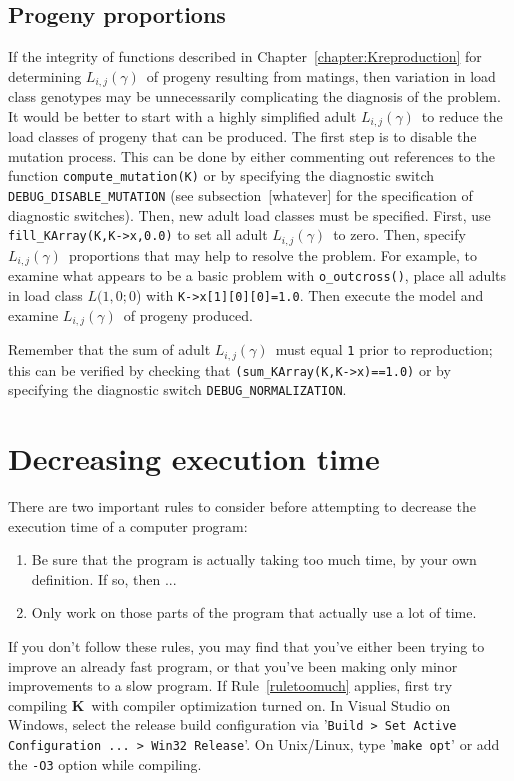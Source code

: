 \documentclass[12pt,twoside,letterpaper,fleqn]{report}
\numberwithin{equation}{section}  %
\newcommand{\K}{{\bf K}}
\newcommand{\Cmdline}[1]{{\tt #1}}
\newcommand{\LCG}[3]{\mbox{$L(#1,#2;#3$)}}
\newcommand{\Lijg}{\mbox{$L_{i,j}(\gamma)$}}     %
\begin{document}
{\subsection{Progeny proportions}

If the integrity of functions described in Chapter~\ref{chapter:Kreproduction} for determining \Lijg\ of progeny resulting from matings, then variation in load class genotypes may be unnecessarily complicating the diagnosis of the problem.  It would be better to start with a highly simplified adult \Lijg\ to reduce the load classes of progeny that can be produced.  The first step is to disable the mutation process.  This can be done by either commenting out references to the function \lstinline{compute_mutation(K)} or by specifying the diagnostic switch \lstinline{DEBUG_DISABLE_MUTATION} (see subsection~[whatever] for the specification of diagnostic switches).  Then, new adult load classes must be specified.  First, use \lstinline{fill_KArray(K,K->x,0.0)} to set all adult \Lijg\ to zero.  Then, specify \Lijg\ proportions that may help to resolve the problem.  For example, to examine what appears to be a basic problem with \lstinline{o_outcross()}, place all adults in load class \LCG{1}{0}{0} with \lstinline{K->x[1][0][0]=1.0}.  Then execute the model and examine \Lijg\ of progeny produced.

Remember that the sum of adult \Lijg\ must equal \lstinline{1} prior to reproduction; this can be verified by checking that \lstinline{(sum_KArray(K,K->x)==1.0)} or by specifying the diagnostic switch \lstinline{DEBUG_NORMALIZATION}.

\section{Decreasing execution time}

There are two important rules to consider before attempting to decrease the execution time of a computer program:
\begin{enumerate}
	\item \label{ruletoomuch} Be sure that the program is actually taking too much time, by your own definition.  If so, then ...
	\item \label{rulefocus} Only work on those parts of the program that actually use a lot of time.
\end{enumerate}
If you don't follow these rules, you may find that you've either been trying to improve an already fast program, or that you've been making only minor improvements to a slow program.  If Rule~\ref{ruletoomuch} applies, first try compiling \K\ with compiler optimization turned on.  In Visual Studio on Windows, select the release build configuration via '\Cmdline{Build > Set Active Configuration ... > Win32 Release}'.  On Unix/Linux, type '\Cmdline{make opt}' or add the \Cmdline{-O3} option while compiling.

}
\end{document}
